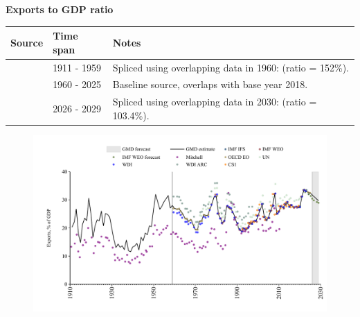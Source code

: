 \documentclass[12pt,a4paper,landscape]{article}
\begin{document}
\begin{adjustbox}{max totalsize={\paperwidth}{\paperheight},center}
\begin{minipage}[t][\textheight][t]{\textwidth}
\begin{figure}[H]
\end{figure}
\end{minipage}
\end{adjustbox}
\begin{adjustbox}{max totalsize={\paperwidth}{\paperheight},center}
\begin{minipage}[t][\textheight][t]{\textwidth}
\vspace*{0.5cm}
{}
\begin{center}
{\Large\bfseries Exports to GDP ratio}
\end{center}
\vspace{0.5cm}
\begin{table}[H]
\centering
\small
\begin{tabular}{|l|l|l|}
\hline
\textbf{Source} & \textbf{Time span} & \textbf{Notes} \\
\hline
\rowcolor{white}\cite{Mitchell}& 1911 - 1959 &Spliced using overlapping data in 1960: (ratio = 152\%). \\
\rowcolor{lightgray}\cite{OECD_EO}& 1960 - 2025 &Baseline source, overlaps with base year 2018. \\
\rowcolor{white}\cite{IMF_WEO_forecast}& 2026 - 2029 &Spliced using overlapping data in 2030: (ratio = 103.4\%). \\
\hline
\end{tabular}
\end{table}
\begin{figure}[H]
\centering
\includegraphics[width=\textwidth,height=0.6\textheight,keepaspectratio]{graphs/ZAF_exports_GDP.pdf}
\end{figure}
\end{minipage}
\end{adjustbox}
\end{document}
